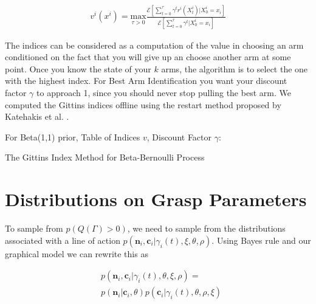 \documentclass[journal,transmag]{IEEEtran}%
\begin{document}
\vspace{-2ex}
\label{eq:git_indices}
\begin{align}
	v^i(x^i) = \underset{\tau>0}{\mbox{max}} \frac{\mathcal{E}[\sum_{t=0}^{\tau}\gamma^tr^i(X_t^i)|X_0^i = x_i]}{\mathcal{E}[\sum_{t=0}^{\tau}\gamma^t|X_0^i = x_i]}
\end{align}


The indices can be considered as a computation of the value in choosing an arm conditioned on the fact that you will give up an choose another arm at some point. Once you know the state of your $k$ arms, the algorithm is to select the one with the highest index.  For Best Arm Identification you want your discount factor $\gamma$ to approach 1, since you should never stop pulling the best arm. We computed the Gittins indices offline using the restart method proposed by Katehakis et al. \cite{katehakis1987multi}.


\begin{algorithm}
 For Beta(1,1) prior, Table of Indices $v$, Discount Factor $\gamma$: \\
 \caption{The Gittins Index Method for Beta-Bernoulli Process}
\end{algorithm}





\section{Distributions on Grasp Parameters}
\label{sec:distgrasp}
 
 To sample from $p(Q(\Gamma)>0)$, we need to sample from the distributions associated with a line of action $p(\textbf{n}_i,\textbf{c}_i|\gamma_i(t),\xi,\theta, \rho)$. Using Bayes rule and our graphical model we can rewrite this as 
 
 \vspace{-2ex}
 \begin{align*}
 &p(\textbf{n}_i,\textbf{c}_i |\gamma_i(t),\theta,\xi,\rho)=\\
 &p(\textbf{n}_i|\textbf{c}_i,\theta)p(\textbf{c}_i|\gamma_i(t),\theta,\rho,\xi)
 \end{align*}
 
\end{document}
